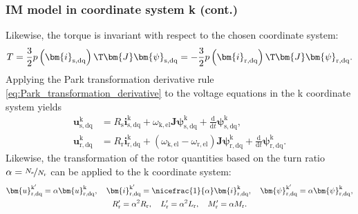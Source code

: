 \begin{frame}
	\frametitle{IM model in coordinate system k (cont.)}
    Likewise, the torque is invariant with respect to the chosen coordinate system:
    \begin{equation}
        T = \frac{3}{2} p \left(\bm{i}_\mathrm{s,dq}\right)\T\bm{J}\bm{\psi}_\mathrm{s,dq} = -\frac{3}{2} p \left(\bm{i}_\mathrm{r,dq}\right)\T\bm{J}\bm{\psi}_\mathrm{r,dq}.
    \end{equation}
    \pause
    Applying the Park transformation derivative rule \eqref{eq:Park_transformation_derivative} to the voltage equations in the k coordinate system yields
    \begin{equation}
        \begin{alignedat}{2}
            \bm{u}^\mathrm{k}_\mathrm{s,dq} &= R_\mathrm{s} \bm{i}^\mathrm{k}_\mathrm{s,dq} + \omega_\mathrm{k,el}\bm{J} \bm{\psi}^\mathrm{k}_\mathrm{s,dq} + \frac{\mathrm{d}}{\mathrm{d}t}\bm{\psi}^\mathrm{k}_\mathrm{s,dq},\\
            \bm{u}^\mathrm{k}_\mathrm{r,dq} &= R_\mathrm{r} \bm{i}^\mathrm{k}_\mathrm{r,dq} +\left(\omega_\mathrm{k,el}-\omega_\mathrm{r,el}\right)\bm{J}\bm{\psi}^\mathrm{k}_\mathrm{r,dq} + \frac{\mathrm{d}}{\mathrm{d}t}\bm{\psi}^\mathrm{k}_\mathrm{r,dq}.
        \end{alignedat}
        \label{eq:IM_model_k_voltage_equations}
    \end{equation}
    \pause
    Likewise, the transformation of the rotor quantities based on the turn ratio $\alpha = \nicefrac{N_\mathrm{s}}{N_\mathrm{r}}$ can be applied to the k coordinate system:
    \begin{equation}
        \begin{gathered}
            \bm{u}^{\mathrm{k}'}_\mathrm{r,dq} = \alpha\bm{u}^\mathrm{k}_\mathrm{r,dq}, \quad \bm{i}^{\mathrm{k}'}_\mathrm{r,dq} = \nicefrac{1}{\alpha}\bm{i}^\mathrm{k}_\mathrm{r,dq}, \quad \bm{\psi}^{\mathrm{k}'}_\mathrm{r,dq} = \alpha\bm{\psi}^\mathrm{k}_\mathrm{r,dq},\\
            R'_\mathrm{r} =  \alpha^2 R_\mathrm{r}, \quad L'_\mathrm{r} =  \alpha^2 L_\mathrm{r}, \quad M'_\mathrm{r} =  \alpha M_\mathrm{r}.
        \end{gathered}
        \label{eq:IM_model_k_rotor_quantities_transformed}
    \end{equation}
\end{frame}

